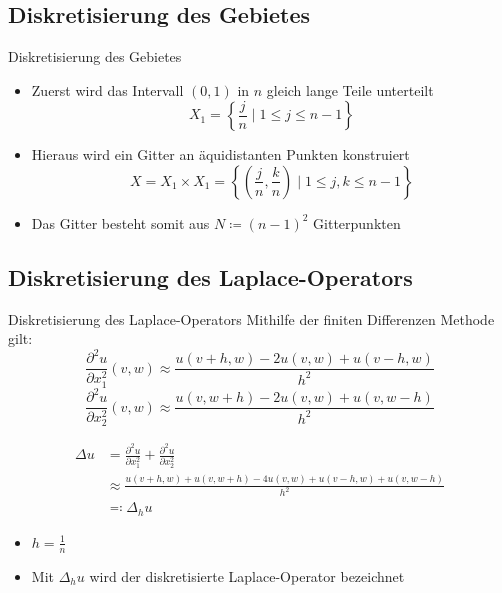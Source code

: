 \documentclass[9pt, t]{beamer}
\begin{document}
\subsection{Diskretisierung des Gebietes}
\begin{frame}{Diskretisierung des Gebietes}
    \begin{itemize}
        \item
              Zuerst wird das Intervall \((0,1)\) in \(n\) gleich lange Teile
              unterteilt
              \[
                  X_1 = \left\{ \frac{j}{n} \mid 1 \leq j \leq n-1 \right\}
              \]
        \item
              Hieraus wird ein Gitter an äquidistanten Punkten konstruiert
              \[
                  X = X_1 \times X_1 = \left\{ \left( \frac{j}{n}, \frac{k}{n} \right) \mid 1 \leq j, k \leq n-1 \right\}
              \]
        \item
              Das Gitter besteht somit aus \(N \coloneq(n - 1)^2\)
              Gitterpunkten
    \end{itemize}
\end{frame}

\subsection{Diskretisierung des Laplace-Operators}
\begin{frame}{Diskretisierung des Laplace-Operators}
    Mithilfe der finiten Differenzen Methode gilt:
    \[
        \frac{\partial^2 u}{\partial x_1^2} (v, w) \approx \frac{u(v + h, w) - 2u(v, w) + u(v - h, w)}{h^2}
    \]
    \[
        \frac{\partial^2 u}{\partial x_2^2} (v, w) \approx \frac{u(v, w + h) - 2u(v, w) + u(v, w - h)}{h^2}
    \]

    \begin{align*}
        \Delta u & = \frac{\partial^2 u}{\partial x_1^2} + \frac{\partial^2 u}{\partial x_2^2}          \\
                 & \approx \frac{u(v + h, w) + u(v, w + h) - 4u(v, w) + u(v - h, w) + u(v, w - h)}{h^2}
        \\
                 & \eqcolon \Delta_h u
    \end{align*}
    \begin{itemize}
        \item \(h = \frac{1}{n}\)
        \item Mit \(\Delta_h u\) wird der diskretisierte Laplace-Operator
              bezeichnet
    \end{itemize}
\end{frame}
\end{document}
